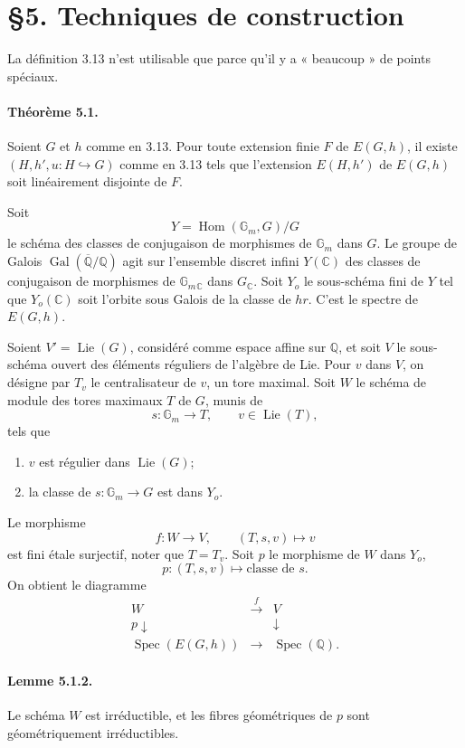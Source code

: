 \documentclass[10pt]{article}
\newcommand{\C}{\mathbb C}
\newcommand{\Gm}{\mathbb G_m}
\newcommand{\Q}{\mathbb Q}
\newcommand{\Hom}{\operatorname{Hom}}
\newcommand{\Lie}{\operatorname{Lie}}
\newcommand{\Gal}{\operatorname{Gal}}
\newcommand{\Spec}{\operatorname{Spec}}
\begin{document}
\section*{\S 5. Techniques de construction}

La définition 3.13 n'est utilisable que parce qu'il y a « beaucoup » de points spéciaux.

\paragraph{Théorème 5.1.} Soient $G$ et $h$ comme en 3.13. Pour toute extension finie $F$ de $E(G,h)$, il existe $(H,h',u:H\hookrightarrow G)$ comme en 3.13 tels que l'extension $E(H,h')$ de $E(G,h)$ soit linéairement disjointe de $F$.

Soit
\[
Y=\Hom(\Gm,G)/G
\]
le schéma des classes de conjugaison de morphismes de $\Gm$ dans $G$. Le groupe de Galois $\Gal(\overline{\Q}/\Q)$ agit sur l'ensemble discret infini $Y(\C)$ des classes de conjugaison de morphismes de $\Gm{}_{\C}$ dans $G_{\C}$. Soit $Y_o$ le sous-schéma fini de $Y$ tel que $Y_o(\C)$ soit l'orbite sous Galois de la classe de $hr$. C'est le spectre de $E(G,h)$.

Soient $V'=\Lie(G)$, considéré comme espace affine sur $\Q$, et soit $V$ le sous-schéma ouvert des éléments réguliers de l'algèbre de Lie. Pour $v$ dans $V$, on désigne par $T_v$ le centralisateur de $v$, un tore maximal. Soit $W$ le schéma de module des tores maximaux $T$ de $G$, munis de
\[
s:\Gm\longrightarrow T,\qquad v\in\Lie(T),
\]
tels que
\begin{enumerate}[label=(\alph*)]
\item $v$ est régulier dans $\Lie(G)$;
\item la classe de $s:\Gm\to G$ est dans $Y_o$.
\end{enumerate}
Le morphisme
\[
f:W\longrightarrow V,\qquad (T,s,v)\longmapsto v
\]
est fini étale surjectif, noter que $T=T_v$. Soit $p$ le morphisme de $W$ dans $Y_o$,
\[
p:(T,s,v)\longmapsto \text{classe de }s.
\]
On obtient le diagramme
\[
\tag{5.1.1}
\begin{array}{ccc}
W & \xrightarrow{\ f\ } & V\\
{\scriptstyle p}\downarrow && \downarrow\\
\Spec(E(G,h)) & \longrightarrow & \Spec(\Q).
\end{array}
\]

\paragraph{Lemme 5.1.2.} Le schéma $W$ est irréductible, et les fibres géométriques de $p$ sont géométriquement irréductibles.
\end{document}
